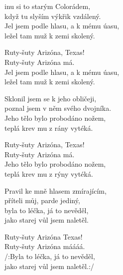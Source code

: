 \ve
{}inu si to starým Colorádem,\\
když tu slyším výkřik vzdálený.\\
Jel jsem podle hlasu, a k mému úasu,\\
ležel tam muž k zemi skolený.

\cho
{}Ruty-šuty Arizóna, Texas!\\
Ruty-šuty Arizóna má.\\
Jel jsem podle hlasu, a k mému úasu,\\
ležel tam muž k zemi skolený.

\ve
Sklonil jsem se k jeho obličeji,\\
poznal jsem v něm svého dvojníka.\\
Jeho tělo bylo probodáno nožem,\\
teplá krev mu z rány vytéká.

\cho
{}Ruty-šuty Arizóna, Texas!\\
Ruty-šuty Arizóna má.\\
Jeho tělo bylo probodáno nožem,\\
teplá krev mu z rýny vytéká.

\ve
Pravil ke mně hlasem zmírajícím,\\
příteli můj, parde jediný,\\
byla to léčka, já to nevěděl,\\
jako starej vůl jsem naletěl.

\cho
Ruty-šuty Arizóna Texas!\\
Ruty-šuty Arizóna máááá.\\
/:Byla to léčka, já to nevěděl,\\
jako starej vůl jsem naletěl.:/

\esong{}